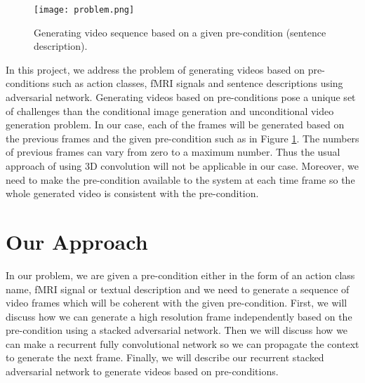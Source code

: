 \documentclass{article}
\begin{document}
\begin{figure}[h]
  \centering
  \texttt{[image: problem.png]} 
  \caption{Generating video sequence based on a given pre-condition (sentence description).}
    \label{problem}
\end{figure}

In this project, we address the problem of generating videos based on pre-conditions such as action classes, fMRI signals and sentence descriptions using adversarial network. Generating videos based on pre-conditions pose a unique set of challenges than the conditional image generation and unconditional video generation problem. In our case, each of the frames will be generated based on the previous frames and the given pre-condition such as in Figure \ref{problem}. The numbers of previous frames can vary from zero to a maximum number. Thus the usual approach of using 3D convolution will not be applicable in our case. Moreover, we need to make the pre-condition available to the system at each time frame so the whole generated video is consistent with the pre-condition.    



\section{Our Approach}
\label{our_approach}
In our problem, we are given a pre-condition either in the form of an action class name, fMRI signal or textual description and we need to generate a sequence of video frames which will be coherent with the given pre-condition. First, we will discuss how we can generate a high resolution frame independently based on the pre-condition using a stacked adversarial network. Then we will discuss how we can make a recurrent fully convolutional network so we can propagate the context to generate the next frame. Finally, we will describe our recurrent stacked adversarial network to generate videos based on pre-conditions.
\end{document}
